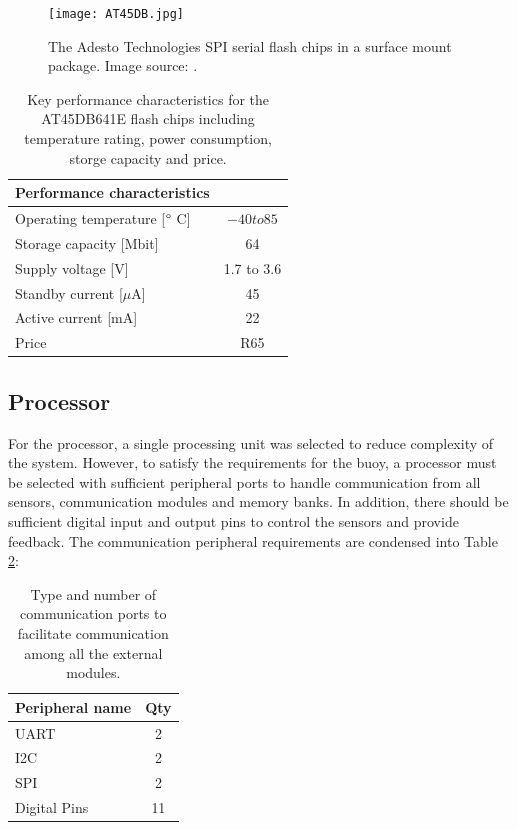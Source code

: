 \begin{figure}[H]
	\centering
	\texttt{[image: AT45DB.jpg]}
	\caption{The Adesto Technologies SPI serial flash chips in a surface mount package. Image source: \cite{flashchipimage}.}
	\label{fig:flashAAHAH}
\end{figure}
\begin{table}[H]
	\centering
	\caption{Key performance characteristics for the AT45DB641E flash chips \cite{AT45DB641E} including temperature rating, power consumption, storge capacity and price.}
	\setlength{\extrarowheight}{5pt}
	\begin{tabular}{lc}
		\hline
		\textbf{Performance characteristics} &\\
		\hline
		\hline
		Operating temperature [$\degree$ C]  & $ -40 to 85$ \\
		\hline
		Storage capacity [Mbit] & 64 \\
		\hline
		Supply voltage [V]    & 1.7 to 3.6\\
		\hline
		Standby current [$\mu$A] & 45 \\
		\hline
		Active current [mA]  & 22 \\
		\hline
		Price   & R65\tablefootnote{Source: \url{https://za.rs-online.com/}}\\
		\hline
		\hline
	\end{tabular}
	\label{tab:flash_specs}
\end{table}

\subsection{Processor}

For the processor, a single processing unit was selected to reduce complexity of the system. However, to satisfy the requirements for the buoy, a processor must be selected with sufficient peripheral ports to handle communication from all sensors, communication modules and memory banks. In addition, there should be sufficient digital input and output pins to control the sensors and provide feedback. The communication peripheral requirements are condensed into Table \ref{tab:micro_ports}: 

\begin{table}[H]
	\centering
	\caption{ Type and number of communication ports to facilitate communication among all the external modules.}
	\setlength{\extrarowheight}{5pt}
	\begin{tabular}{lc}
		\hline 
		\textbf{Peripheral name} & \textbf{Qty }\\
		\hline \hline
		UART & 2\\
		\hline
		I2C & 2\\
		\hline
		SPI & 2\\
		\hline
		Digital Pins & 11\\
		\hline 
		\hline
	\end{tabular}
	\label{tab:micro_ports}
\end{table}

